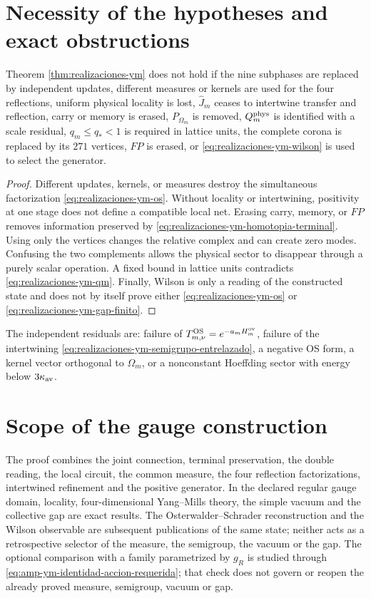 \section*{Necessity of the hypotheses and exact obstructions}

\begin{ablation}
\label{abl:realizaciones-ym}
Theorem \ref{thm:realizaciones-ym} does not hold if the
nine subphases are replaced by independent updates, different measures or
kernels are used for the four reflections, uniform physical locality
is lost, \(\widehat J_m\) ceases to intertwine transfer and reflection,
carry or memory is erased, \(P_{\Omega_m}\) is removed,
\(Q_m^{\rm phys}\) is identified with a scale residual,
\(q_m\leq q_*<1\) is required in lattice units, the complete corona is replaced
by its \(271\) vertices, \(FP\) is erased, or
\eqref{eq:realizaciones-ym-wilson} is used to select the generator.
\end{ablation}

\begin{proof}
Different updates, kernels, or measures destroy the simultaneous
factorization \eqref{eq:realizaciones-ym-os}. Without locality or intertwining,
positivity at one stage does not define a compatible local net. Erasing carry,
memory, or \(FP\) removes information preserved by
\eqref{eq:realizaciones-ym-homotopia-terminal}. Using only the
vertices changes the relative complex and can create zero modes. Confusing
the two complements allows the physical sector to disappear through a
purely scalar operation. A fixed bound in lattice units contradicts
\eqref{eq:realizaciones-ym-qm}. Finally, Wilson is only a reading of the
constructed state and does not by itself prove either
\eqref{eq:realizaciones-ym-os} or
\eqref{eq:realizaciones-ym-gap-finito}.
\end{proof}

The independent residuals are: failure of
\(\widehat T_{m,\nu}^{\rm OS}=e^{-a_m\widehat H_m^{\rm ov}}\), failure of the
intertwining \eqref{eq:realizaciones-ym-semigrupo-entrelazado}, a negative
OS form, a kernel vector orthogonal to \(\Omega_m\), or a nonconstant
Hoeffding sector with energy below \(3\kappa_{\rm av}\).

\section*{Scope of the gauge construction}

The proof combines the joint connection, terminal preservation, the
double reading, the local circuit, the common measure, the four reflection
factorizations, intertwined refinement and the positive generator. In the
declared regular gauge domain,
locality, four-dimensional Yang--Mills theory, the simple vacuum and the
collective gap are exact results. The Osterwalder--Schrader
reconstruction and the Wilson observable are
subsequent publications of the same state; neither acts as a
retrospective selector of the measure, the semigroup, the vacuum or the
gap. The optional comparison with a family parametrized by \(g_R\) is studied
through \eqref{eq:amp-ym-identidad-accion-requerida}; that check does not
govern or reopen the already proved measure, semigroup, vacuum or
gap.

